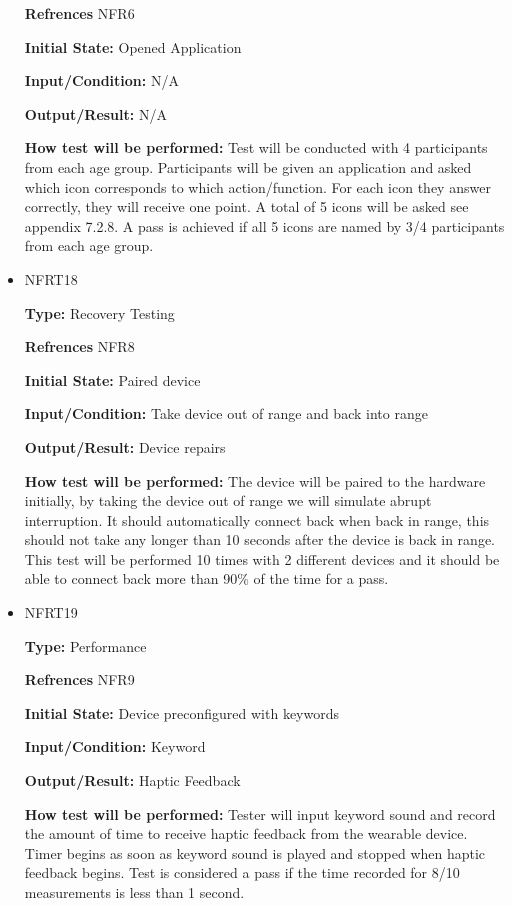 \documentclass[12pt, titlepage]{article}
\begin{document}
\begin{itemize}
\textbf{Refrences} NFR6
					
\textbf{Initial State:} Opened Application
					
\textbf{Input/Condition:} N/A
					
\textbf{Output/Result:} N/A
					
\textbf{How test will be performed:} Test will be conducted with 4 participants from each age group. Participants will be given an application and asked which icon corresponds to which action/function. For each icon they answer correctly, they will receive one point. A total of 5 icons will be asked see appendix 7.2.8. A pass is achieved if all 5 icons are named by 3/4 participants from each age group.

\item{NFRT18}

\textbf{Type:} Recovery Testing

\textbf{Refrences} NFR8
					
\textbf{Initial State:} Paired device
					
\textbf{Input/Condition:} Take device out of range and back into range
					
\textbf{Output/Result:} Device repairs
					
\textbf{How test will be performed:} The device will be paired to the hardware initially, by taking the device out of range we will simulate abrupt interruption. It should automatically connect back when back in range, this should not take any longer than 10 seconds after the device is back in range. This test will be performed 10 times with 2 different devices and it should be able to connect back more than 90\% of the time for a pass.

\item{NFRT19}

\textbf{Type:} Performance

\textbf{Refrences} NFR9
					
\textbf{Initial State:} Device preconfigured with keywords
					
\textbf{Input/Condition:} Keyword
					
\textbf{Output/Result:} Haptic Feedback
					
\textbf{How test will be performed:} Tester will input keyword sound and record the amount of time to receive haptic feedback from the wearable device. Timer begins as soon as keyword sound is played and stopped when haptic feedback begins. Test is considered a pass if the time recorded for 8/10 measurements is less than 1 second.


\end{itemize}
\end{document}
